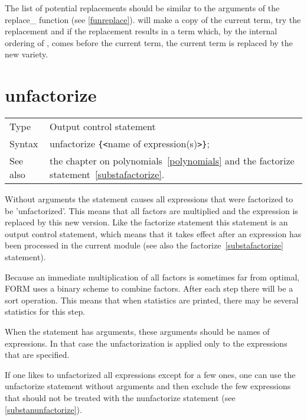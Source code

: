 \noindent The list of potential replacements should be 
similar to the arguments of the replace\_ 
function (see \ref{funreplace}). {\FORM} will 
make a copy of the current term, try the replacement and if the replacement 
results in a term which, by the internal ordering of {\FORM}, comes before 
the current term, the current term is replaced by the new variety. 
\vspace{10mm}


\section{unfactorize}
\label{substaunfactorize}

\noindent \begin{tabular}{ll}
Type & Output control statement\\
Syntax & unfactorize \verb:{:{\tt<}name of expression(s){\tt>}\verb:}:;
\\ See also & the chapter on polynomials~\ref{polynomials} and the 
factorize statement~\ref{substafactorize}.
\end{tabular} \vspace{4mm}

\noindent Without arguments the statement causes all expressions that were 
factorized to be 'unfactorized'. This means that all factors are multiplied 
and the expression is replaced by this new version. Like the factorize 
statement this statement is an output control statement, which means that 
it takes effect after an expression has been processed in the current 
module (see also the factorize~\ref{substafactorize} statement).

\noindent Because an immediate multiplication of all factors is sometimes 
far from optimal, FORM uses a binary scheme to combine factors. After each 
step there will be a sort operation. This means that when statistics are 
printed, there may be several statistics for this step.

\noindent When the statement has arguments, these arguments should be names 
of expressions. In that case the unfactorization is applied only to the 
expressions that are specified.

\noindent If one likes to unfactorized all expressions except for a few 
ones, one can use the unfactorize statement without arguments and then 
exclude the few expressions that should not be treated with the 
nunfactorize statement (see \ref{substanunfactorize}).
\vspace{10mm} 

